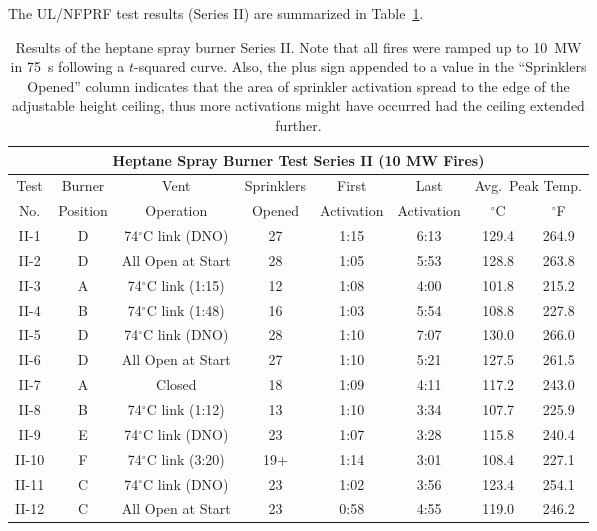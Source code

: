 \clearpage

The UL/NFPRF test results (Series II) are summarized in Table~\ref{ULburnermatrixII}.

\begin{table}[ht!]
\begin{center}
\begin{tabular}{|c||c|c|c|c|c|c|c|}
\hline
\multicolumn{8}{|c|}{\bf Heptane Spray Burner Test Series II (10 MW Fires)}\\ \hline \hline
Test & Burner   & Vent      & Sprinklers & First      & Last      & \multicolumn{2}{|c|}{Avg.~Peak Temp.} \\ \cline{7-8}
No.  & Position & Operation & Opened     & Activation & Activation & $^\circ$C & $^\circ$F   \\
\hline \hline
II-1  & D  & 74$^\circ$C link (DNO)  & 27 & 1:15 & 6:13 & 129.4 &264.9 \\ \hline
II-2  & D  & All Open at Start       & 28 & 1:05 & 5:53 & 128.8 &263.8 \\ \hline
II-3  & A  & 74$^\circ$C link (1:15) & 12 & 1:08 & 4:00 & 101.8 &215.2 \\ \hline
II-4  & B  & 74$^\circ$C link (1:48) & 16 & 1:03 & 5:54 & 108.8 &227.8 \\ \hline
II-5  & D  & 74$^\circ$C link (DNO)  & 28 & 1:10 & 7:07 & 130.0 &266.0 \\ \hline
II-6  & D  & All Open at Start       & 27 & 1:10 & 5:21 & 127.5 &261.5 \\ \hline
II-7  & A  & Closed                  & 18 & 1:09 & 4:11 & 117.2 &243.0 \\ \hline
II-8  & B  & 74$^\circ$C link (1:12) & 13 & 1:10 & 3:34 & 107.7 &225.9 \\ \hline
II-9  & E  & 74$^\circ$C link (DNO)  & 23 & 1:07 & 3:28 & 115.8 &240.4 \\ \hline
II-10 & F  & 74$^\circ$C link (3:20) & 19+& 1:14 & 3:01 & 108.4 &227.1 \\ \hline
II-11 & C  & 74$^\circ$C link (DNO)  & 23 & 1:02 & 3:56 & 123.4 &254.1 \\ \hline
II-12 & C  & All Open at Start       & 23 & 0:58 & 4:55 & 119.0 &246.2 \\ \hline
\end{tabular}
\end{center}
\caption[Results of the UL/NFPRF Experiments, Series~II.]
{Results of the heptane spray burner Series II. Note that all fires
were ramped up to 10~MW in 75~s following a $t$-squared curve. Also, the
plus sign appended to a value in the ``Sprinklers Opened''
column indicates that the area of sprinkler activation spread to the
edge of the adjustable height ceiling, thus more activations might have
occurred had the ceiling extended further.}
\label{ULburnermatrixII}
\end{table}


